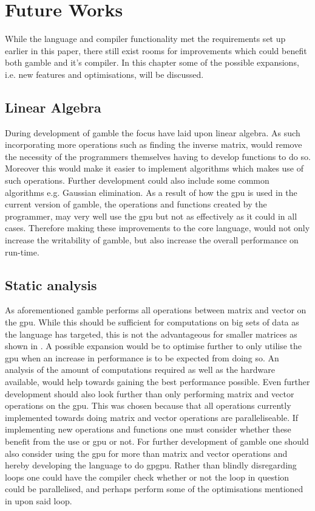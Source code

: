 \chapter{Future Works}\label{cha:future_works}
While the language and compiler functionality met the requirements set up earlier in this paper, there still exist rooms for improvements which could benefit both \gls{gamble} and it's compiler.
In this chapter some of the possible expansions, i.e. new features and optimisations, will be discussed.

\section{Linear Algebra}\label{improve:LIAL}
During development of \gls{gamble} the focus have laid upon linear algebra.
As such incorporating more operations such as finding the inverse matrix, would remove the necessity of the programmers themselves having to develop functions to do so.
Moreover this would make it easier to implement algorithms which makes use of such operations.
Further development could also include some common algorithms e.g. Gaussian elimination.
As a result of how the \acrshort{gpu} is used in the current version of \gls{gamble}, the operations and functions created by the programmer, may very well use the \acrshort{gpu} but not as effectively as it could in all cases.
Therefore making these improvements to the core language, would not only increase the writability of \gls{gamble}, but also increase the overall performance on run-time.

\section{Static analysis}
As aforementioned \gls{gamble} performs all operations between matrix and vector on the \acrshort{gpu}.
While this should be sufficient for computations on big sets of data as the language has targeted, this is not the advantageous for smaller matrices as shown in .
A possible expansion would be to optimise further to only utilise the \acrshort{gpu} when an increase in performance is to be expected from doing so.
An analysis of the amount of computations required as well as the hardware available, would help towards gaining the best performance possible.
Even further development should also look further than only performing matrix and vector operations on the \acrshort{gpu}.
This was chosen because that all operations currently implemented towards doing matrix and vector operations are paralleliseable.
If implementing new operations and functions one must consider whether these benefit from the use or \acrshort{gpu} or not.
For further development of \gls{gamble} one should also consider using the \acrshort{gpu} for more than matrix and vector operations and hereby developing the language to do \gls{gpgpu}. 
Rather than blindly disregarding loops one could have the compiler check whether or not the loop in question could be parallelised, and perhaps perform some of the optimisations mentioned in  upon said loop.
 
